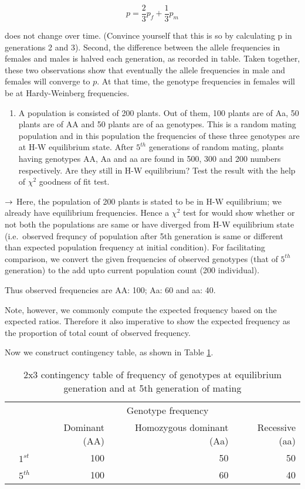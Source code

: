 \documentclass[nofonts,]{tufte-handout}
\providecommand{\tightlist}{%
  \setlength{\itemsep}{0pt}\setlength{\parskip}{0pt}}
\begin{document}
\[
p = \frac{2}{3}p_f + \frac{1}{3}p_m
\]

does not change over time. (Convince yourself that this is so by
calculating p in generations 2 and 3). Second, the difference between
the allele frequencies in females and males is halved each generation,
as recorded in table. Taken together, these two observations show that
eventually the allele frequencies in male and females will converge to
\(p\). At that time, the genotype frequencies in females will be at
Hardy-Weinberg frequencies.

\begin{enumerate}
\def\labelenumi{\arabic{enumi}.}
\setcounter{enumi}{2}
\tightlist
\item
  A population is consisted of 200 plants. Out of them, 100 plants are
  of Aa, 50 plants are of AA and 50 plants are of aa genotypes. This is
  a random mating population and in this population the frequencies of
  these three genotypes are at H-W equilibrium state. After \(5^{th}\)
  generations of random mating, plants having genotypes AA, Aa and aa
  are found in 500, 300 and 200 numbers respectively. Are they still in
  H-W equilibrium? Test the result with the help of \(\chi^2\) goodness
  of fit test.
\end{enumerate}

\(\Large \rightarrow\) Here, the population of 200 plants is stated to
be in H-W equilibrium; we already have equilibrium frequencies. Hence a
\(\chi^2\) test for would show whether or not both the populations are
same or have diverged from H-W equilibrium state (i.e.~observed frequncy
of population after 5th generation is same or different than expected
population frequency at initial condition). For facilitating comparison,
we convert the given frequencies of observed genotypes (that of
\(5^{th}\) generation) to the add upto current population count (200
individual).

Thus observed frequencies are AA: 100; Aa: 60 and aa: 40.

Note, however, we commonly compute the expected frequency based on the
expected ratios. Therefore it also imperative to show the expected
frequency as the proportion of total count of observed frequency.

Now we construct contingency table, as shown in Table
\ref{tab:hw-equilibrium-independence-chi}.

\begin{longtable}[t]{llrrr}
\caption{\label{tab:hw-equilibrium-independence-chi}2x3 contingency table of frequency of genotypes at equilibrium generation and at 5th generation of mating}\\
\toprule
\multicolumn{2}{c}{  } & \multicolumn{3}{c}{Genotype frequency} \\
\cmidrule(l{3pt}r{3pt}){3-5}
  &   & Dominant (AA) & Homozygous dominant (Aa) & Recessive (aa)\\
\midrule
 & $1^{st}$ & 100 & 50 & 50\\
\cmidrule{2-5}\nopagebreak
\multirow{-2}{*}{\raggedright\arraybackslash Generation} & $5^{th}$ & 100 & 60 & 40\\
\bottomrule
\end{longtable}
\end{document}
